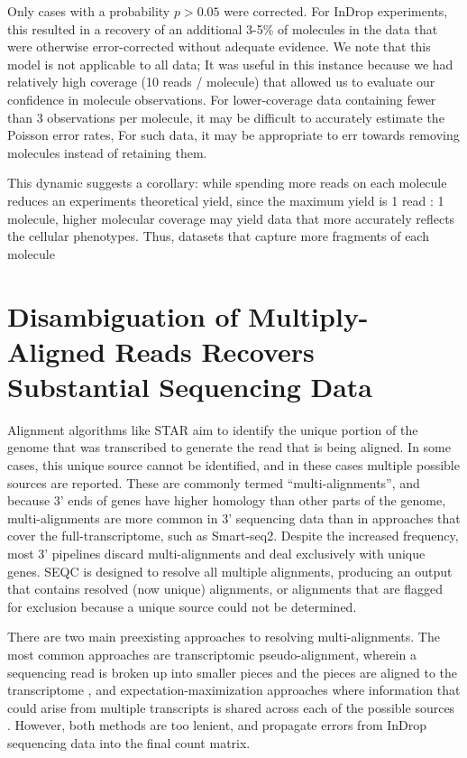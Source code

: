 Only cases with a probability $p > 0.05$ were corrected.  
For InDrop experiments, this resulted in a recovery of an additional 3-5\% of molecules in the data that were otherwise error-corrected without adequate evidence. 
We note that this model is not applicable to all data; It was useful in this instance because we had relatively high coverage (10 reads / molecule) that allowed us to evaluate our confidence in molecule observations. 
For lower-coverage data containing fewer than 3 observations per molecule, it may be difficult to accurately estimate the Poisson error rates, 
For such data, it may be appropriate to err towards removing molecules instead of retaining them.

This dynamic suggests a corollary: while spending more reads on each molecule reduces an experiments theoretical yield, since the maximum yield is 1 read : 1 molecule, higher molecular coverage may yield data that more accurately reflects the cellular phenotypes. 
Thus, datasets that capture more fragments of each molecule  

\section{Disambiguation of Multiply-Aligned Reads Recovers Substantial Sequencing Data}

Alignment algorithms like STAR aim to identify the unique portion of the genome that was transcribed to generate the read that is being aligned. 
In some cases, this unique source cannot be identified, and in these cases multiple possible sources are reported. 
These are commonly termed ``multi-alignments'', and because 3' ends of genes have higher homology than other parts of the genome, multi-alignments are more common in 3' sequencing data than in approaches that cover the full-transcriptome, such as Smart-seq2. 
Despite the increased frequency, most 3' pipelines discard multi-alignments and deal exclusively with unique genes. 
SEQC is designed to resolve all multiple alignments, producing an output that contains resolved (now unique) alignments, or alignments that are flagged for exclusion because a unique source could not be determined.

There are two main preexisting approaches to resolving multi-alignments. 
The most common approaches are transcriptomic pseudo-alignment, wherein a sequencing read is broken up into smaller pieces and the pieces are aligned to the transcriptome \citep{Patro2017,Bray2016}, and expectation-maximization approaches where information that could arise from multiple transcripts is shared across each of the possible sources \citep{Li2011}.
However, both methods are too lenient, and propagate errors from InDrop sequencing data into the final count matrix. 

